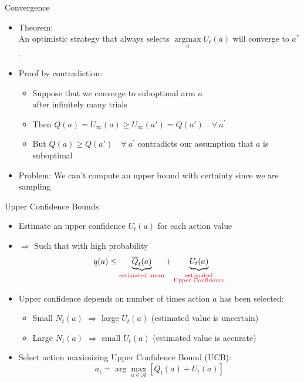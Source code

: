 \documentclass[11pt,table]{beamer}
\begin{document}
\begin{frame}{Convergence}


    \begin{itemize}
        \item  Theorem:\\ An optimistic strategy that always selects $\underset{a}{\operatorname{argmax}} U_t(a)$ will converge to $a^{*}$.\\[2ex]

\item  Proof by contradiction:

\begin{itemize}
\item  Suppose that we converge to suboptimal arm $a$\\ after infinitely many trials\\[2ex]
\item  Then $\overline{Q}(a) =U_{\infty}(a) \geq U_{\infty}(a') =\overline{Q}(a')\quad \forall \ a^{\prime}$\\[2ex]
\item  But $\overline{Q}(a) \geq \overline{Q}(a') \quad \forall \ a^{\prime}$ contradicts our assumption that $a$ is suboptimal\\[2ex]\pause
    \end{itemize}
					\item Problem: We can’t compute an upper bound with certainty since we are sampling
    \end{itemize}
		


\end{frame}


\begin{frame}{Upper Confidence Bounds}
    \begin{itemize}
        \item Estimate an upper confidence $U_t(a)$ for each action value
        \item[] $\Rightarrow$ Such that with high probability
        \[
            q(a) \leq \underbrace{\overline{Q}_t(a)}_{\text{\textcolor{red1}{estimated mean}}} + \underbrace{U_t(a)}_{\substack{\text{\textcolor{red1}{estimated}}\\ \text{\textcolor{red1}{Upper Confidence}}}}
        \]
				\pause
        \item Upper confidence depends on number of times action $a$ has been selected:
        \begin{itemize}
            \item Small $N_t(a)$ $\Rightarrow$ large $U_t(a)$ (estimated value is uncertain)
            \item Large $N_t(a)$ $\Rightarrow$ small $U_t(a)$ (estimated value is accurate)
        \end{itemize}
				\pause
        \item Select action maximizing Upper Confidence Bound (UCB):
        \[
            a_t = \arg\max_{a \in \mathcal{A}} \left[ \overline{Q}_t(a) + U_t(a) \right]
        \]
    \end{itemize}
\end{frame}
\end{document}
